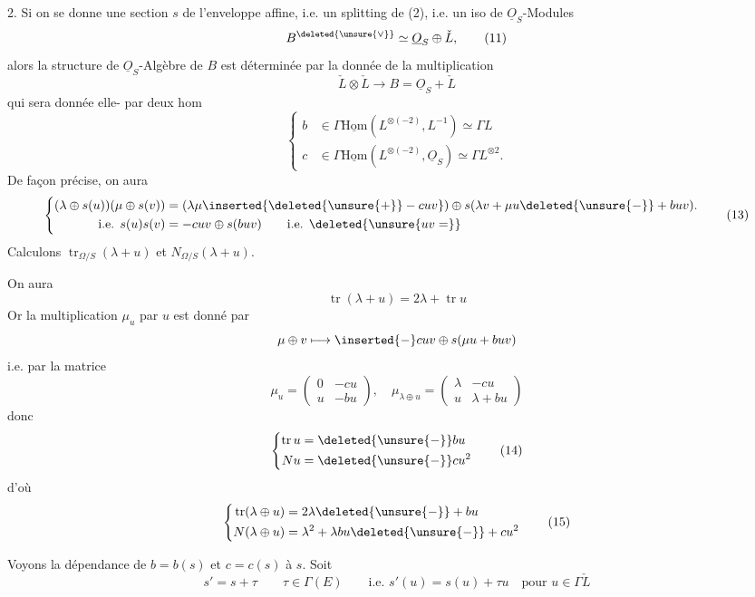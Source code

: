 2. Si on se donne une section $s$ de l'enveloppe affine, i.e. un splitting de (2), i.e.
un iso de $\underline{O}_S$-Modules
\[
B^{\deleted{\unsure{\vee}}}\simeq\underline{O}_S\oplus\check L,\tag*{(11)}
\]
alors la structure de $\underline{O}_S$-Algèbre de $B$ est déterminée
par la donnée de la multiplication
\[
\check L\otimes\check L\longrightarrow B=\underline{O}_S+\check L
\]
qui sera donnée elle- par deux hom
\[
\left\{\begin{aligned}
b&\in\Gamma\underline{\mathrm{Hom}}(L^{\otimes(-2)},L^{-1})\simeq\Gamma L\\
c&\in\Gamma\underline{\mathrm{Hom}}(L^{\otimes(-2)},\underline{O}_S)\simeq\Gamma L^{\otimes2}.
\end{aligned}\right. \tag*{(12)}
\]
De façon précise, on aura
\[
\left\{\begin{aligned}
(\lambda\oplus s(u))(\mu\oplus s(v))&=(\lambda\mu\inserted{\deleted{\unsure{+}}-cuv})\oplus s(\lambda v+\mu u\deleted{\unsure{-}}+buv).\\
\text{i.e. }s(u)s(v)&=-cuv\oplus s(buv)\qquad\text{i.e. }\deleted{\unsure{uv=}}
\end{aligned}\right. \tag*{(13)}
\]
 Calculons $\operatorname{tr}_{\Omega/S}(\lambda+u)$ et $N_{\Omega/S}(\lambda+u)$.

 On aura
\[
\operatorname{tr}(\lambda+u)=2\lambda+\operatorname{tr}u
\]
Or la multiplication $\mu_u$ par $u$ est donné par
\[
\mu\oplus v\longmapsto\inserted{-}cuv\oplus s(\mu u+buv)
\]
i.e. par la matrice
\[
\mu_u=\begin{pmatrix}0&-cu\\u&-bu\end{pmatrix},\quad
\mu_{\lambda\oplus u}=\begin{pmatrix}\lambda&-cu\\u&\lambda+bu\end{pmatrix}
\]
donc
\[
\left\{\begin{aligned}
\operatorname{tr}u&=\deleted{\unsure{-}}bu\\
Nu&=\deleted{\unsure{-}}cu^2
\end{aligned}\right. \tag*{(14)}
\]
d'où
\[
\left\{\begin{aligned}
\operatorname{tr}(\lambda\oplus u)&=2\lambda\deleted{\unsure{-}}+bu\\
N(\lambda\oplus u)&=\lambda^2+\lambda bu\deleted{\unsure{-}}+cu^2
\end{aligned}\right. \tag*{(15)}
\]

Voyons la dépendance de $b=b(s)$ et $c=c(s)$  à $s$. Soit 
\[
s'=s+\tau\qquad \tau\in\Gamma(E)\qquad\text{i.e. }s'(u)=s(u)+\tau u
\quad\text{pour }u\in\Gamma\check L \tag*{(16)}
\]


